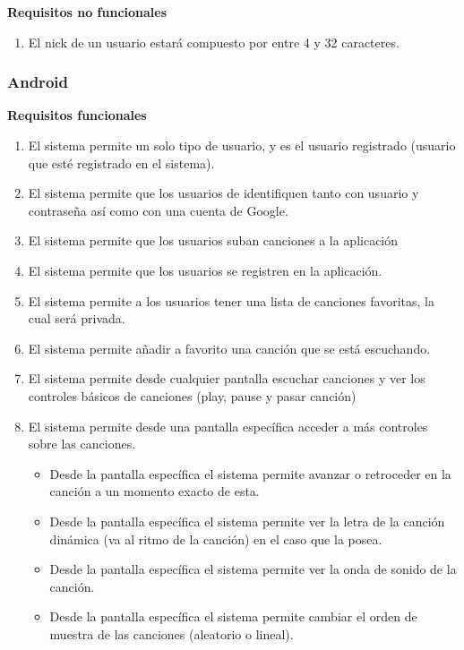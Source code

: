 \documentclass[12pt]{article}%
\begin{document}
\textbf{Requisitos no funcionales}
\begin{enumerate}
	\item El nick de un usuario estar\'a compuesto por entre 4 y 32 caracteres.\\
	
\end{enumerate}

\subsubsection{Android}

\textbf{Requisitos funcionales}
\begin{enumerate}
	\item El sistema permite un solo tipo de usuario, y es el usuario registrado (usuario que est\'e registrado en el sistema).
	\item El sistema permite que los usuarios de identifiquen tanto con usuario y contrase\~na as\'i como con una cuenta de Google.
	\item  El sistema permite que los usuarios suban canciones a la aplicaci\'on
	\item  El sistema permite que los usuarios se registren en la aplicaci\'on.
	\item  El sistema permite a los usuarios tener una lista de canciones favoritas, la cual ser\'a privada.
	\item  El sistema permite a\~nadir a favorito una canci\'on que se est\'a escuchando.
	\item  El sistema permite desde cualquier pantalla escuchar canciones y ver los controles b\'asicos de canciones (play, pause y pasar canci\'on)
	\item  El sistema permite desde una pantalla espec\'ifica acceder a m\'as controles sobre las canciones.
	\begin{itemize}
		\item  Desde la pantalla espec\'ifica el sistema permite avanzar o retroceder en la canci\'on a un momento exacto de esta.
		\item  Desde la pantalla espec\'ifica el sistema permite ver la letra de la canci\'on din\'amica (va al ritmo de la canci\'on) en el caso que la posea.
		\item  Desde la pantalla espec\'ifica el sistema permite ver la onda de sonido de la canci\'on.
		\item  Desde la pantalla espec\'ifica el sistema permite cambiar el orden de muestra de las canciones (aleatorio o lineal).
	\end{itemize}
	

\end{enumerate}
\end{document}
